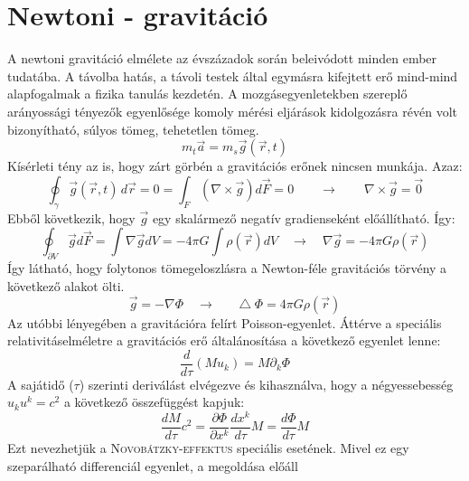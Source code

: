 \documentclass[a4paper,12pt]{article}
\newcommand*\Laplace{\mathop{}\!\mathbin\bigtriangleup}
\begin{document}
\section{ Newtoni - gravitáció}
A newtoni gravitáció elmélete az évszázadok során beleivódott minden ember tudatába. A távolba hatás, a távoli testek által egymásra kifejtett erő mind-mind alapfogalmak a fizika tanulás kezdetén. \newline
A mozgásegyenletekben szereplő arányossági tényezők egyenlősége komoly mérési eljárások kidolgozásra révén volt bizonyítható, súlyos tömeg, tehetetlen tömeg.
\begin{equation*}
m_{t}\vec{a} = m_{s}\vec{g}(\vec{r},t)
\end{equation*}
Kísérleti tény az is, hogy zárt görbén a gravitációs erőnek nincsen munkája. Azaz:
\begin{equation*}
\oint_\gamma \vec{g}(\vec{r},t) \,d\vec{r} = 0 = \int_F (\nabla \times \vec{g}) d\vec{F} = 0 \quad \quad \rightarrow \quad \quad \nabla \times \vec{g} = \vec{0}
\end{equation*}
Ebből következik, hogy $\vec{g}$ egy skalármező negatív gradienseként előállítható. Így:
\begin{equation*}
\oint_{\partial V} \vec{g} d\vec{F} = \int  \nabla\vec{g}dV = - 4\pi G \int \rho(\vec{r})dV \quad \rightarrow \quad \nabla\vec{g} = -4\pi G\rho(\vec{r})
\end{equation*}
Így látható, hogy folytonos tömegeloszlásra a Newton-féle gravitációs törvény a következő alakot ölti.
\begin{equation*}
\vec{g} = -\nabla\Phi \quad \rightarrow \quad \Laplace\Phi = 4\pi G \rho(\vec{r})
\end{equation*}
Az utóbbi lényegében a gravitációra felírt Poisson-egyenlet. \newline
\hspace{0.5cm} Áttérve a speciális relativitáselméletre a gravitációs erő általánosítása a következő egyenlet lenne:
\begin{equation*}
\frac{d}{d\tau}(Mu_{k}) = M \partial_{k}\Phi
\end{equation*}
A sajátidő ($\tau$) szerinti deriválást elvégezve és kihasználva, hogy a négyessebesség $u_{k}u^{k} = c^{2}$ a következő összefüggést kapjuk:
\begin{equation*}
\frac{dM}{d\tau}c^{2} = \frac{\partial \Phi}{\partial x^{k}} \frac{dx^{k}}{d\tau}M = \frac{d\Phi}{d\tau}M
\end{equation*}
Ezt nevezhetjük a \textsc{Novobátzky-effektus}  speciális esetének. Mivel ez egy szeparálható differenciál egyenlet, a megoldása előáll
\end{document}
